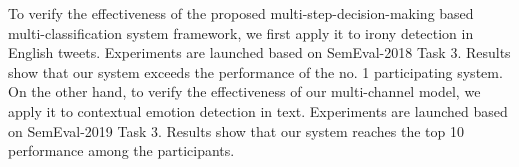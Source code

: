 \begin{eabstract}
\begin{enumerate}
\end{enumerate}

To verify the effectiveness of the proposed multi-step-decision-making based multi-classification system framework, we first apply it to irony detection in English tweets. Experiments are launched based on SemEval-2018 Task 3. Results show that our system exceeds the performance of the no. 1 participating system. On the other hand, to verify the effectiveness of our multi-channel model, we apply it to contextual emotion detection in text. Experiments are launched based on SemEval-2019 Task 3. Results show that our system reaches the top 10 performance among the participants.

\end{eabstract}

